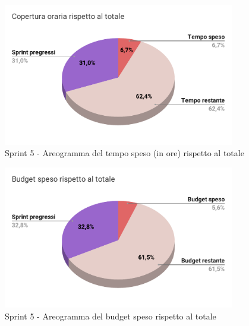   \begin{figure}[H]
    \centering
    \includegraphics[width=0.90\textwidth]{assets/Consuntivo/Sprint-5/copertura_oraria.pdf}
    \caption{Sprint 5 - Areogramma del tempo speso (in ore) rispetto al totale}
  \end{figure}
  
  \begin{figure}[H]
    \centering
    \includegraphics[width=0.90\textwidth]{assets/Consuntivo/Sprint-5/budget_speso.pdf}
    \caption{Sprint 5 - Areogramma del budget speso rispetto al totale}
  \end{figure}
  
